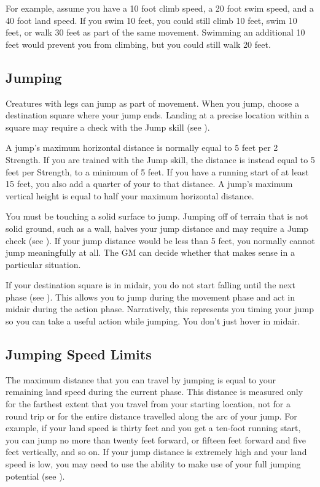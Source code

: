         For example, assume you have a 10 foot climb speed, a 20 foot swim speed, and a 40 foot land speed.
        If you swim 10 feet, you could still climb 10 feet, swim 10 feet, or walk 30 feet as part of the same movement.
        Swimming an additional 10 feet would prevent you from climbing, but you could still walk 20 feet.

    \subsection{Jumping}\label{Jumping}
        Creatures with legs can jump as part of movement.
        When you jump, choose a destination square where your jump ends.
        Landing at a precise location within a square may require a check with the Jump skill (see ).

        A jump's maximum horizontal distance is normally equal to 5 feet per 2 Strength.
        If you are trained with the Jump skill, the distance is instead equal to 5 feet per Strength, to a minimum of 5 feet.
        If you have a running start of at least 15 feet, you also add a quarter of your  to that distance.
        A jump's maximum vertical height is equal to half your maximum horizontal distance.

        You must be touching a solid surface to jump.
        Jumping off of terrain that is not solid ground, such as a wall, halves your jump distance and may require a Jump check (see ).
        If your jump distance would be less than 5 feet, you normally cannot jump meaningfully at all.
        The GM can decide whether that makes sense in a particular situation.

        If your destination square is in midair, you do not start falling until the next phase (see ).
        This allows you to jump during the movement phase and act in midair during the action phase.
        Narratively, this represents you timing your jump so you can take a useful action while jumping.
        You don't just hover in midair.

        \subsection{Jumping Speed Limits}
            The maximum distance that you can travel by jumping is equal to your remaining land speed during the current phase.
            This distance is measured only for the farthest extent that you travel from your starting location, not for a round trip or for the entire distance travelled along the arc of your jump.
            For example, if your land speed is thirty feet and you get a ten-foot running start, you can jump no more than twenty feet forward, or fifteen feet forward and five feet vertically, and so on.
            If your jump distance is extremely high and your land speed is low, you may need to use the  ability to make use of your full jumping potential (see ).

